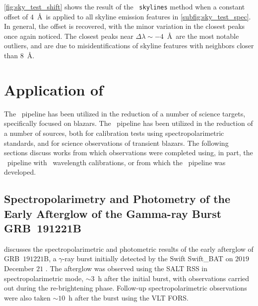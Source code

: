 \autoref{fig:sky_test_shift} shows the result of the \stops\ \texttt{skylines} method when a constant offset of $4$~\AA\ is applied to all skyline emission features in \autoref{subfig:sky_test_spec}.
In general, the offset is recovered, with the minor variation in the closest peaks once again noticed.
The closest peaks near $\Delta \lambda \sim -4$~\AA\ are the most notable outliers, and are due to misidentifications of skyline features with neighbors closer than $8$~\AA.

\section[Application of \textsc{stops}]{Application of \stops} \label{sec:app_stops}

The \stops\ pipeline has been utilized in the reduction of a number of science targets, specifically focused on blazars.
The \stops\ pipeline has been utilized in the reduction of a number of sources, both for calibration tests using spectropolarimetric standards, and for science observations of transient blazars.
The following sections discuss works from which observations were completed using, in part, the \stops\ pipeline with \iraf\ wavelength calibrations, or from which the \stops\ pipeline was developed.



\subsection[Buckley et al.\ (2019)]{%
    Spectropolarimetry and Photometry of the Early Afterglow of the Gamma-ray Burst GRB~191221B\\
    \citep{Buckley191221B}
}

\citet{Buckley191221B} discusses the spectropolarimetric and photometric results of the early afterglow of GRB~$191221$B, a $\gamma$-ray burst initially detected by the \gls{Swift} \gls{Swift_BAT} \citep{swift_bat} on $2019$ December $21$ \citep{grb191221b}.
The afterglow was observed using the \gls{SALT} \gls{RSS} in spectropolarimetric mode, $\sim 3$~h after the initial burst, with observations carried out during the re-brightening phase.
Follow-up spectropolarimetric observations were also taken $\sim 10$~h after the burst using the \gls{VLT} \gls{FORS}.

